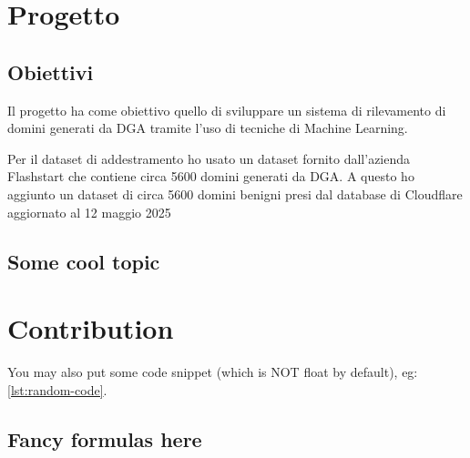 \documentclass[12pt,a4paper,openright,twoside]{book}
\begin{document}
\chapter{Progetto}
\section{Obiettivi}
Il progetto ha come obiettivo quello di sviluppare un sistema
di rilevamento di domini generati da \acrshort{DGA} tramite
l'uso di tecniche di Machine Learning. 

Per il dataset di addestramento ho usato un dataset fornito dall'azienda 
Flashstart che contiene circa 5600 domini generati da \acrshort{DGA}.
A questo ho aggiunto un dataset di circa 5600 domini benigni
presi dal database di Cloudflare aggiornato
al 12 maggio 2025\cite{cloudflare_domains}


\section{Some cool topic}

\chapter{Contribution}

You may also put some code snippet (which is NOT float by default), eg: \cref{lst:random-code}.



\section{Fancy formulas here}



\backmatter



\end{document}
